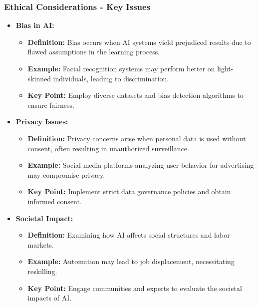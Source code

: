 \documentclass[aspectratio=169]{beamer}
\begin{document}
\begin{frame}[fragile]
    \frametitle{Ethical Considerations - Key Issues}
    \begin{itemize}
        \item \textbf{Bias in AI:}
            \begin{itemize}
                \item \textbf{Definition:} Bias occurs when AI systems yield prejudiced results due to flawed assumptions in the learning process.
                \item \textbf{Example:} Facial recognition systems may perform better on light-skinned individuals, leading to discrimination.
                \item \textbf{Key Point:} Employ diverse datasets and bias detection algorithms to ensure fairness.
            \end{itemize}
        
        \item \textbf{Privacy Issues:}
            \begin{itemize}
                \item \textbf{Definition:} Privacy concerns arise when personal data is used without consent, often resulting in unauthorized surveillance.
                \item \textbf{Example:} Social media platforms analyzing user behavior for advertising may compromise privacy.
                \item \textbf{Key Point:} Implement strict data governance policies and obtain informed consent.
            \end{itemize}
        
        \item \textbf{Societal Impact:}
            \begin{itemize}
                \item \textbf{Definition:} Examining how AI affects social structures and labor markets.
                \item \textbf{Example:} Automation may lead to job displacement, necessitating reskilling.
                \item \textbf{Key Point:} Engage communities and experts to evaluate the societal impacts of AI.
            \end{itemize}
    \end{itemize}
\end{frame}
\end{document}
